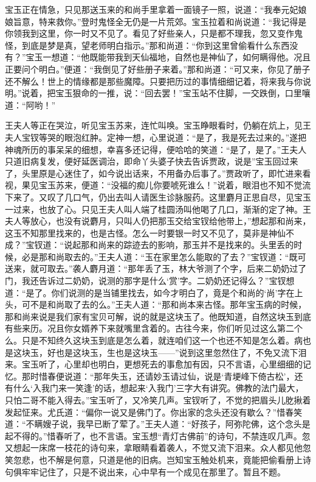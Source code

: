 \begin{parag}
    宝玉正在情急，只见那送玉来的和尚手里拿着一面镜子一照，说道：“我奉元妃娘娘旨意，特来救你。”登时鬼怪全无仍是一片荒郊。宝玉拉着和尚说道：“我记得是你领我到这里，你一时又不见了。看见了好些亲人，只是都不理我，忽又变作鬼怪，到底是梦是真，望老师明白指示。”那和尚道：“你到这里曾偷看什么东西没有？”宝玉一想道：“他既能带我到天仙福地，自然也是神仙了，如何瞒得他。况且正要问个明白。”便道：“我倒见了好些册子来着。”那和尚道：“可又来，你见了册子还不解么！世上的情缘都是那些魔障。只要把历过的事情细细记着，将来我与你说明。”说着，把宝玉狠命的一推，说：“回去罢！”宝玉站不住脚，一交跌倒，口里嚷道：“阿哟！”
\end{parag}


\begin{parag}
    王夫人等正在哭泣，听见宝玉苏来，连忙叫唤。宝玉睁眼看时，仍躺在炕上，见王夫人宝钗等哭的眼泡红肿。定神一想，心里说道：“是了，我是死去过来的。”遂把神魂所历的事呆呆的细想，幸喜多还记得，便哈哈的笑道：“是了，是了。”王夫人只道旧病复发，便好延医调治，即命丫头婆子快去告诉贾政，说是”宝玉回过来了，头里原是心迷住了，如今说出话来，不用备办后事了。”贾政听了，即忙进来看视，果见宝玉苏来，便道：“没福的痴儿你要唬死谁么！”说着，眼泪也不知不觉流下来了。又叹了几口气，仍出去叫人请医生诊脉服药。这里麝月正思自尽，见宝玉一过来，也放了心。只见王夫人叫人端了桂圆汤叫他喝了几口，渐渐的定了神。王夫人等放心，也没有说麝月，只叫人仍把那玉交给宝钗给他带上，”想起那和尚来，这玉不知那里找来的，也是古怪。怎么一时要银一时又不见了，莫非是神仙不成？”宝钗道：“说起那和尚来的踪迹去的影响，那玉并不是找来的。头里丢的时候，必是那和尚取去的。”王夫人道：“玉在家里怎么能取的了去？”宝钗道：“既可送来，就可取去。”袭人麝月道：“那年丢了玉，林大爷测了个字，后来二奶奶过了门，我还告诉过二奶奶，说测的那字是什么‘赏’字。二奶奶还记得么？”宝钗想道：“是了。你们说测的是当铺里找去，如今才明白了，竟是个和尚的‘尚’字在上头，可不是和尚取了去的么。”王夫人道：“那和尚本来古怪。那年宝玉病的时候，那和尚来说是我们家有宝贝可解，说的就是这块玉了。他既知道，自然这块玉到底有些来历。况且你女婿养下来就嘴里含着的。古往今来，你们听见过这么第二个么。只是不知终久这块玉到底是怎么着，就连咱们这一个也还不知是怎么着。病也是这块玉，好也是这块玉，生也是这块玉——”说到这里忽然住了，不免又流下泪来。宝玉听了，心里却也明白，更想死去的事愈加有因，只不言语，心里细细的记忆。那时惜春便说道：“那年失玉，还请妙玉请过仙，说是‘青埂峰下倚古松’，还有什么‘入我门来一笑逢’的话，想起来‘入我门’三字大有讲究。佛教的法门最大，只怕二哥不能入得去。”宝玉听了，又冷笑几声。宝钗听了，不觉的把眉头儿肐揪着发起怔来。尤氏道：“偏你一说又是佛门了。你出家的念头还没有歇么？”惜春笑道：“不瞒嫂子说，我早已断了荤了。”王夫人道：“好孩子，阿弥陀佛，这个念头是起不得的。”惜春听了，也不言语。宝玉想“青灯古佛前”的诗句，不禁连叹几声。忽又想起一床席一枝花的诗句来，拿眼睛看着袭人，不觉又流下泪来。众人都见他忽笑忽悲，也不解是何意，只道是他的旧病。岂知宝玉触处机来，竟能把偷看册上诗句俱牢牢记住了，只是不说出来，心中早有一个成见在那里了。暂且不题。
\end{parag}


